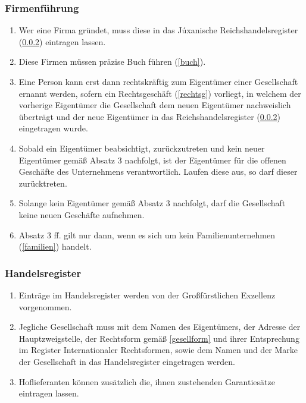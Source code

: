 \documentclass{article}
\begin{document}
\subsubsection{Firmenführung} \label{firm}
\begin{enumerate}[(1)]
    \item Wer eine Firma gründet, muss diese in das Júxanische Reichshandelsregister (\ref{register}) eintragen lassen.
    \item Diese Firmen müssen präzise Buch führen (\ref{buch}).
    \item Eine Person kann erst dann rechtskräftig zum Eigentümer einer Gesellschaft ernannt werden, sofern ein Rechtsgeschäft (\ref{rechtsg}) vorliegt, in welchem der vorherige Eigentümer die Gesellschaft dem neuen Eigentümer nachweislich überträgt und der neue Eigentümer in das Reichshandelsregister (\ref{register}) eingetragen wurde.
    \item Sobald ein Eigentümer beabsichtigt, zurückzutreten und kein neuer Eigentümer gemäß Absatz 3 nachfolgt, ist der Eigentümer für die offenen Geschäfte des Unternehmens verantwortlich. Laufen diese aus, so darf dieser zurücktreten.
    \item Solange kein Eigentümer gemäß Absatz 3 nachfolgt, darf die Gesellschaft keine neuen Geschäfte aufnehmen.
    \item Absatz 3 ff. gilt nur dann, wenn es sich um kein Familienunternehmen (\ref{familien}) handelt.
\end{enumerate}


\subsubsection{Handelsregister} \label{register}
\begin{enumerate}[(1)]
    \item Einträge im Handelsregister werden von der Großfürstlichen Exzellenz vorgenommen.
    \item Jegliche Gesellschaft muss mit dem Namen des Eigentümers, der Adresse der Hauptzweigstelle, der Rechtsform gemäß \ref{gesellform} und ihrer Entsprechung im Register Internationaler Rechtsformen, sowie dem Namen und der Marke der Gesellschaft in das Handelsregister eingetragen werden.
    \item Hoflieferanten können zusätzlich die, ihnen zustehenden Garantiesätze eintragen lassen.
\end{enumerate}
\end{document}
